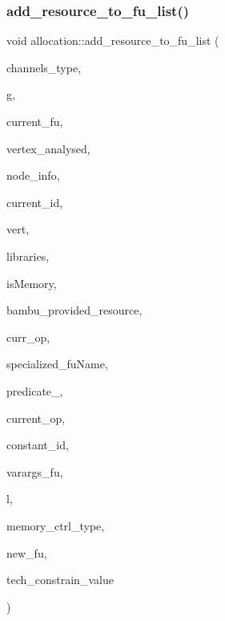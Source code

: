 \subsubsection{\texorpdfstring{add\+\_\+resource\+\_\+to\+\_\+fu\+\_\+list()}{add\_resource\_to\_fu\_list()}}
{\footnotesize\ttfamily void allocation\+::add\+\_\+resource\+\_\+to\+\_\+fu\+\_\+list (\begin{DoxyParamCaption}\item[{std\+::string}]{channels\+\_\+type,  }\item[{const \hyperlink{op__graph_8hpp_a9a0b240622c47584bee6951a6f5de746}{Op\+Graph\+Const\+Ref}}]{g,  }\item[{\hyperlink{technology__node_8hpp_a33dd193b7bd6b987bf0d8a770a819fa7}{technology\+\_\+node\+Ref}}]{current\+\_\+fu,  }\item[{\hyperlink{classCustomOrderedSet}{Custom\+Ordered\+Set}$<$ \hyperlink{graph_8hpp_abefdcf0544e601805af44eca032cca14}{vertex} $>$}]{vertex\+\_\+analysed,  }\item[{node\+\_\+kind\+\_\+prec\+\_\+info\+Ref}]{node\+\_\+info,  }\item[{unsigned int}]{current\+\_\+id,  }\item[{\hyperlink{classCustomOrderedSet}{Custom\+Ordered\+Set}$<$ \hyperlink{graph_8hpp_abefdcf0544e601805af44eca032cca14}{vertex} $>$\+::const\+\_\+iterator}]{vert,  }\item[{const std\+::vector$<$ std\+::string $>$ \&}]{libraries,  }\item[{bool}]{is\+Memory,  }\item[{std\+::string}]{bambu\+\_\+provided\+\_\+resource,  }\item[{\hyperlink{structoperation}{operation} $\ast$}]{curr\+\_\+op,  }\item[{std\+::string}]{specialized\+\_\+fu\+Name,  }\item[{bool}]{predicate\+\_,  }\item[{std\+::string}]{current\+\_\+op,  }\item[{\hyperlink{classHLS__manager_a972627cc658afa992590b9d2bf1a1e87}{H\+L\+S\+\_\+manager\+::io\+\_\+binding\+\_\+type}}]{constant\+\_\+id,  }\item[{bool}]{varargs\+\_\+fu,  }\item[{unsigned int}]{l,  }\item[{std\+::string}]{memory\+\_\+ctrl\+\_\+type,  }\item[{std\+::map$<$ std\+::string, \hyperlink{technology__node_8hpp_a33dd193b7bd6b987bf0d8a770a819fa7}{technology\+\_\+node\+Ref} $>$}]{new\+\_\+fu,  }\item[{unsigned int}]{tech\+\_\+constrain\+\_\+value }\end{DoxyParamCaption})\hspace{0.3cm}{\ttfamily [protected]}}


